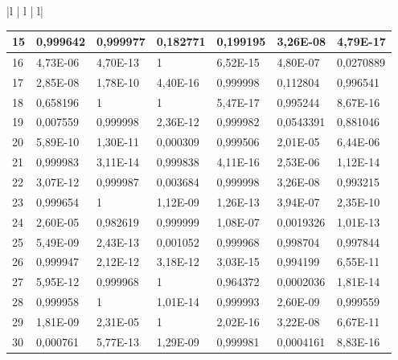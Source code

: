\documentclass[a4paper,10pt]{article}
\begin{document}
{\begin{tabular}{ |l | l | l| }
\begin{centering}
\begin{centering}
{\begin{tabular}{ |l|l|l|l|l|l|l| }
	15	       & 0,999642 & 0,999977 & 0,182771 & 0,199195 & 3,26E-08  & 4,79E-17       \\ \hline                               
	16	       & 4,73E-06 & 4,70E-13 & 1        & 6,52E-15 & 4,80E-07  & 0,0270889      \\ \hline                            
	17	       & 2,85E-08 & 1,78E-10 & 4,40E-16 & 0,999998 & 0,112804  &  0,996541      \\ \hline                                   
	18	       & 0,658196 & 1        & 1        & 5,47E-17 & 0,995244  &  8,67E-16      \\ \hline                
	19	       & 0,007559 & 0,999998 & 2,36E-12 & 0,999982 & 0,0543391 &  0,881046      \\ \hline                                    
	20	       & 5,89E-10 & 1,30E-11 & 0,000309 & 0,999506 & 2,01E-05  & 6,44E-06       \\ \hline                             
	21	       & 0,999983 & 3,11E-14 & 0,999838 & 4,11E-16 & 2,53E-06  & 1,12E-14       \\ \hline                        
	22	       & 3,07E-12 & 0,999987 & 0,003684 & 0,999998 & 3,26E-08  & 0,993215       \\ \hline                            
	23	       & 0,999654 & 1        & 1,12E-09 & 1,26E-13 & 3,94E-07  & 2,35E-10       \\ \hline                          
	24	       & 2,60E-05 & 0,982619 & 0,999999 & 1,08E-07 & 0,0019326 &  1,01E-13      \\ \hline                                   
	25	       & 5,49E-09 & 2,43E-13 & 0,001052 & 0,999968 & 0,998704  &  0,997844      \\ \hline                                   
	26	       & 0,999947 & 2,12E-12 & 3,18E-12 & 3,03E-15 & 0,994199  &  6,55E-11      \\ \hline                               
	27	       & 5,95E-12 & 0,999968 & 1        & 0,964372 & 0,0002036 &  1,81E-14      \\ \hline                            
	28	       & 0,999958 & 1        & 1,01E-14 & 0,999993 & 2,60E-09  & 0,999559       \\ \hline                      
	29	       & 1,81E-09 & 2,31E-05 & 1        & 2,02E-16 & 3,22E-08  & 6,67E-11       \\ \hline                              
	30	       & 0,000761 & 5,77E-13 & 1,29E-09 & 0,999981 & 0,0004161 &  8,83E-16      \\ \hline                                       

\end{tabular}}
\end{centering}
\end{centering}
\end{tabular}}
\end{document}
